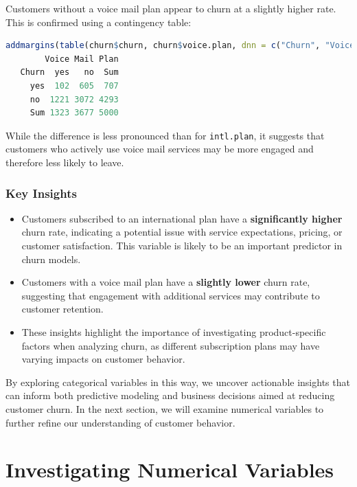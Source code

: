 \documentclass[
]{book}
\newcommand{\passthrough}[1]{#1}
\providecommand{\tightlist}{%
  \setlength{\itemsep}{0pt}\setlength{\parskip}{0pt}}
\theoremstyle{definition}
\theoremstyle{definition}
\theoremstyle{definition}
\theoremstyle{definition}
\theoremstyle{remark}
\begin{document}
Customers without a voice mail plan appear to churn at a slightly higher rate. This is confirmed using a contingency table:

\begin{lstlisting}[language=R]
addmargins(table(churn$churn, churn$voice.plan, dnn = c("Churn", "Voice Mail Plan")))
        Voice Mail Plan
   Churn  yes   no  Sum
     yes  102  605  707
     no  1221 3072 4293
     Sum 1323 3677 5000
\end{lstlisting}

While the difference is less pronounced than for \passthrough{\lstinline!intl.plan!}, it suggests that customers who actively use voice mail services may be more engaged and therefore less likely to leave.

\subsubsection*{Key Insights}\label{key-insights}

\begin{itemize}
\tightlist
\item
  Customers subscribed to an international plan have a \textbf{significantly higher} churn rate, indicating a potential issue with service expectations, pricing, or customer satisfaction. This variable is likely to be an important predictor in churn models.
\item
  Customers with a voice mail plan have a \textbf{slightly lower} churn rate, suggesting that engagement with additional services may contribute to customer retention.
\item
  These insights highlight the importance of investigating product-specific factors when analyzing churn, as different subscription plans may have varying impacts on customer behavior.
\end{itemize}

By exploring categorical variables in this way, we uncover actionable insights that can inform both predictive modeling and business decisions aimed at reducing customer churn. In the next section, we will examine numerical variables to further refine our understanding of customer behavior.

\section{Investigating Numerical Variables}\label{EDA-sec-numeric}
\end{document}
